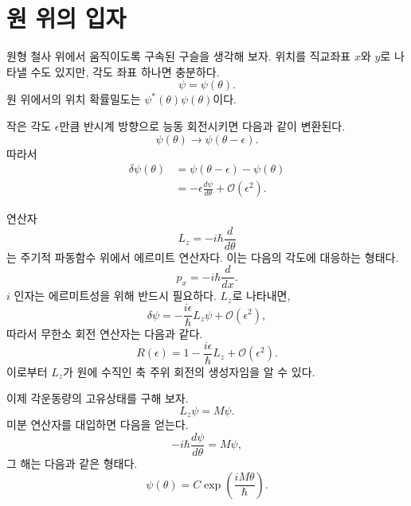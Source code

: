 \section{원 위의 입자}

원형 철사 위에서 움직이도록 구속된 구슬을 생각해 보자. 위치를 직교좌표 \(x\)와 \(y\)로 나타낼 수도 있지만, 각도 좌표 하나면 충분하다.
\begin{equation}
\psi=\psi(\theta).
\end{equation}
원 위에서의 위치 확률밀도는 \(\psi^*(\theta)\psi(\theta)\)이다.

작은 각도 \(\epsilon\)만큼 반시계 방향으로 능동 회전시키면 다음과 같이 변환된다.
\begin{equation}
\psi(\theta)\longrightarrow\psi(\theta-\epsilon).
\end{equation}
따라서
\begin{align}
\delta\psi(\theta)
&=\psi(\theta-\epsilon)-\psi(\theta)\\
&=-\epsilon\frac{d\psi}{d\theta}
+\mathcal O(\epsilon^2).
\end{align}

연산자
\begin{equation}
L_z=-i\hbar\frac{d}{d\theta}
\end{equation}
는 주기적 파동함수 위에서 에르미트 연산자다. 이는 다음의 각도에 대응하는 형태다.
\begin{equation}
p_x=-i\hbar\frac{d}{dx}.
\end{equation}
\(i\) 인자는 에르미트성을 위해 반드시 필요하다. \(L_z\)로 나타내면,
\begin{equation}
\delta\psi
=-\frac{i\epsilon}{\hbar}L_z\psi
+\mathcal O(\epsilon^2),
\end{equation}
따라서 무한소 회전 연산자는 다음과 같다.
\begin{equation}
R(\epsilon)
=1-\frac{i\epsilon}{\hbar}L_z
+\mathcal O(\epsilon^2).
\end{equation}
이로부터 \(L_z\)가 원에 수직인 축 주위 회전의 생성자임을 알 수 있다.

\begin{classroomqa}
\end{classroomqa}

이제 각운동량의 고유상태를 구해 보자.
\begin{equation}
L_z\psi=M\psi.
\end{equation}
미분 연산자를 대입하면 다음을 얻는다.
\begin{equation}
-i\hbar\frac{d\psi}{d\theta}=M\psi,
\end{equation}
그 해는 다음과 같은 형태다.
\begin{equation}
\psi(\theta)=C\exp\left(\frac{iM\theta}{\hbar}\right).
\end{equation}

